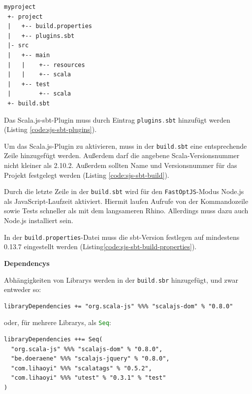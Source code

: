 \documentclass[a4paper, 12pt, hidelinks, listof=totoc, listoftables=totoc, bibliography=totoc]{scrreprt}
\newcommand{\code}[1]{\lstinline[language=Scala, style=inline]|#1|}
\newcommand{\MyMiniSec}[1]{\rmfamily\fontsize{12}{15}\selectfont
	\vspace{7pt}\textbf{#1} %
}
\begin{document}
\begin{lstlisting}[caption={Struktur eines einfachen Scala.js Projekts.}, label={code:sjs-project-struct}]
myproject
 +- project
 |   +-- build.properties
 |   +-- plugins.sbt
 |- src
 |   +-- main
 |   |    +-- resources
 |   |    +-- scala
 |   +-- test
 |        +-- scala
 +- build.sbt
\end{lstlisting}

Das Scala.js-sbt-Plugin muss durch Eintrag \code{plugins.sbt} hinzufügt werden (Listing \ref{code:sjs-sbt-plugins}).



Um das Scala.js-Plugin zu aktivieren, muss in der \code{build.sbt} eine entsprechende Zeile hinzugefügt werden. Außerdem darf die angebene Scala-Versionsnummer nicht kleiner als 2.10.2. Außerdem sollten Name und Versionsnummer für das Projekt festgelegt werden (Listing \ref{code:sjs-sbt-build}).



Durch die letzte Zeile in der \code{build.sbt} wird für den \code{FastOptJS}-Modus Node.js als JavaScript-Laufzeit aktiviert. Hiermit laufen Aufrufe von der Kommandozeile sowie Tests schneller als mit dem langsameren Rhino. Allerdings muss dazu auch Node.js installiert sein.



In der \code{build.properties}-Datei muss die sbt-Version festlegen auf mindestens 0.13.7 eingestellt werden (Listing\ref{code:sjs-sbt-build-properties}).


\MyMiniSec{Dependencys}

Abhängigkeiten von Librarys werden in der \code{build.sbr} hinzugefügt, und zwar entweder so:

\begin{lstlisting}[style=snippet]
libraryDependencies += "org.scala-js" %%% "scalajs-dom" % "0.8.0"
\end{lstlisting}

oder, für mehrere Librarys, als \code{Seq}:

\begin{lstlisting}[style=snippet]
libraryDependencies ++= Seq(
  "org.scala-js" %%% "scalajs-dom" % "0.8.0",
  "be.doeraene" %%% "scalajs-jquery" % "0.8.0",
  "com.lihaoyi" %%% "scalatags" % "0.5.2",
  "com.lihaoyi" %%% "utest" % "0.3.1" % "test"
)
\end{lstlisting}
\end{document}
